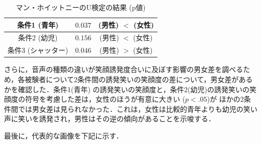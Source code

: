 \documentclass[submit,techreq]{ec2014}
\begin{document}
\begin{table}[htb]
  \begin{center}
    \caption{マン・ホイットニーのU検定の結果 (p値)}
    \begin{tabular}{|c|c|c|}  \hline
      条件1 (青年) & $0.037$ & (男性) $<$ (女性) \\ \hline
      条件2 (幼児)  & $0.156$ & (男性) $<$ (女性) \\ \hline
      条件3 (シャッター) & $0.046$ & (男性) $>$ (女性) \\ \hline
    \end{tabular}
    \label{manw}
  \end{center}
\end{table}


さらに，音声の種類の違いが笑顔誘発度合いに及ぼす影響の男女差を調べるため，各被験者について2条件間の誘発笑いの笑顔度の差について，男女差があるかを確認した．条件1(青年) の誘発笑いの笑顔度と，条件2(幼児)の誘発笑いの笑顔度の符号を考慮した差は，女性のほうが有意に大きい ($p < .05$)が
ほかの2条件間では男女差は見られなかった．これは，女性は比較的青年よりも幼児の笑い声に笑いを誘発され，男性はその逆の傾向があることを示唆する．





最後に，代表的な画像を下記に示す．
\end{document}
